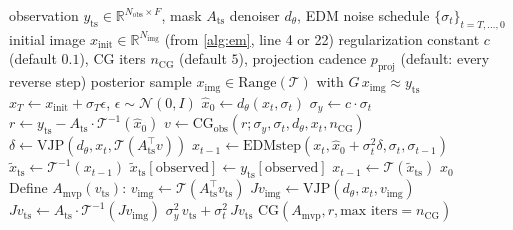 \documentclass{article}
\theoremstyle{plain}
\theoremstyle{definition}
\theoremstyle{remark}
\newcommand{\tsimg}{\mathcal{T}}
\newcommand{\imgts}{\mathcal{T}^{-1}}
\newcommand{\lmmps}{L\mbox{-}\textsc{mmps}}
\newcommand{\Nimg}{N_{\mathrm{img}}}
\newcommand{\Nobs}{N_{\mathrm{obs}}}
\newcommand{\Ats}{A_{\mathrm{ts}}}
\newcommand{\yts}{y_{\mathrm{ts}}}
\newcommand{\ximg}{x_{\mathrm{img}}}
\begin{document}
\begin{algorithm}[h]
\caption{$\lmmps$ E-step (single sample)}
\label{alg:estep}
\begin{algorithmic}[1]
\Require observation $\yts \in \mathbb{R}^{\Nobs \times F}$, mask $\Ats$
\Require denoiser $d_\theta$, EDM noise schedule $\{\sigma_t\}_{t = T, \ldots, 0}$
\Require initial image $x_{\mathrm{init}} \in \mathbb{R}^{\Nimg}$ (from \cref{alg:em}, line 4 or 22)
\Require regularization constant $c$ (default $0.1$), CG iters $n_{\mathrm{CG}}$ (default $5$), projection cadence $p_{\mathrm{proj}}$ (default: every reverse step)
\Ensure posterior sample $\ximg \in \mathrm{Range}(\tsimg)$ with $G\,\ximg \approx \yts$
\State $x_T \gets x_{\mathrm{init}} + \sigma_T \epsilon$, \quad $\epsilon \sim \mathcal{N}(0, I)$
  \State $\hat{x}_0 \gets d_\theta(x_t, \sigma_t)$ 
  \State $\sigma_y \gets c \cdot \sigma_t$ 
  \State $r \gets \yts - \Ats \cdot \imgts(\hat{x}_0)$ 
  \State $v \gets \mathrm{CG}_{\mathrm{obs}}(r; \sigma_y, \sigma_t, d_\theta, x_t, n_{\mathrm{CG}})$ \Comment{runs in $\mathbb{R}^{\Nobs \times F}$}
  \State $\delta \gets \mathrm{VJP}(d_\theta, x_t, \tsimg(\Ats^\top v))$ 
  \State $x_{t-1} \gets \mathrm{EDMstep}(x_t, \hat{x}_0 + \sigma_t^2 \delta, \sigma_t, \sigma_{t-1})$
   
    \State $\tilde{x}_{\mathrm{ts}} \gets \imgts(x_{t-1})$
    \State $\tilde{x}_{\mathrm{ts}}[\mathrm{observed}] \gets \yts[\mathrm{observed}]$ 
    \State $x_{t-1} \gets \tsimg(\tilde{x}_{\mathrm{ts}})$
  \EndIf
\EndFor
\State \Return $x_0$
\\
  \State Define $A_{\mathrm{mvp}}(v_{\mathrm{ts}})$:
  \State \quad $v_{\mathrm{img}} \gets \tsimg(\Ats^\top v_{\mathrm{ts}})$ 
  \State \quad $J v_{\mathrm{img}} \gets \mathrm{VJP}(d_\theta, x_t, v_{\mathrm{img}})$ 
  \State \quad $J v_{\mathrm{ts}} \gets \Ats \cdot \imgts(J v_{\mathrm{img}})$ 
  \State \quad \Return $\sigma_y^2\, v_{\mathrm{ts}} + \sigma_t^2\, J v_{\mathrm{ts}}$
  \State \Return $\mathrm{CG}(A_{\mathrm{mvp}}, r, \text{max iters} = n_{\mathrm{CG}})$
\EndFunction
\end{algorithmic}
\end{algorithm}
\end{document}
